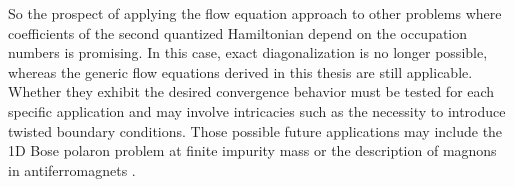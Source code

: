 So the prospect of applying the flow equation approach to other problems where coefficients of the second quantized Hamiltonian depend on the occupation numbers is promising. In this case, exact diagonalization is no longer possible, whereas the generic flow equations derived in this thesis are still applicable. Whether they exhibit the desired convergence behavior must be tested for each specific application and may involve intricacies such as the necessity to introduce twisted boundary conditions. Those possible future applications may include the 1D Bose polaron problem at finite impurity mass or the description of magnons in antiferromagnets \cite{Bermes_2023}.
